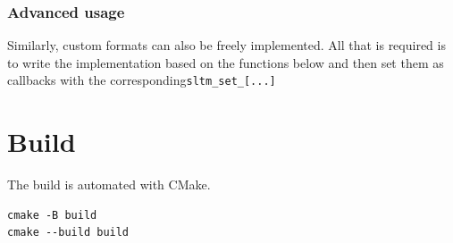 \documentclass[english]{aghengthesis} %
\begin{document}
\subsubsection{Advanced usage}
Similarly, custom formats can also be freely implemented. All that is required is to write the implementation based on the functions below and then set them as callbacks with the corresponding\texttt{sltm\_set\_[...]} 







\section{Build}
The build is automated with CMake.
\begin{lstlisting}[style=cli]
cmake -B build
cmake --build build
\end{lstlisting}
\end{document}
